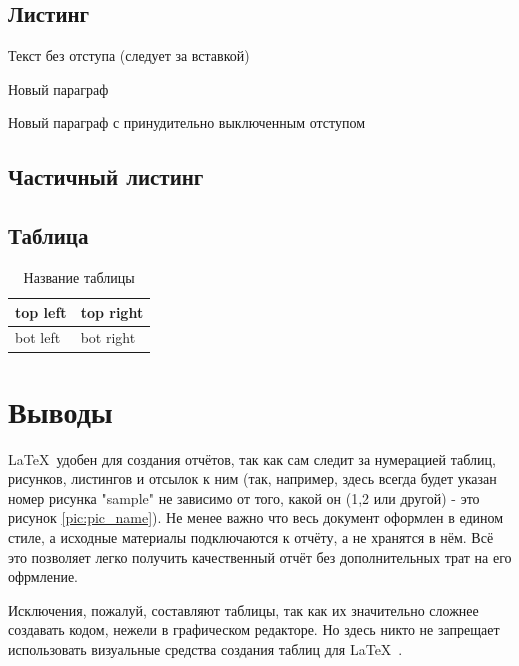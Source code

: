 \subsection{Листинг}


\parindent=1cm %
Текст без отступа (следует за вставкой)

Новый параграф

\noindent Новый параграф с принудительно выключенным отступом


\subsection{Частичный листинг}
\makeatletter
\def\lst@PlaceNumber{\llap{\normalfont
                \lst@numberstyle{\the\lst@lineno}\kern\lst@numbersep}}
\makeatother


\parindent=1cm

\subsection{Таблица}

\begin{table}[H]
	\caption{ Название таблицы}
	\begin{center}
		\begin{tabular}{|l|l|}
			\hline
			top left & top right\\ \hline
			bot left & bot right\\ \hline
		\end{tabular}
		\label{tabular:tab_examp}
	\end{center}
\end{table}

\section{Выводы}
\LaTeX\ удобен для создания отчётов, так как сам следит за нумерацией таблиц, рисунков, листингов и отсылок к ним (так, например, здесь всегда будет указан номер рисунка "sample" не зависимо от того, какой он (1,2 или другой) - это рисунок \ref{pic:pic_name}). Не менее важно что весь документ оформлен в едином стиле, а исходные материалы подключаются к отчёту, а не хранятся в нём. Всё это позволяет легко получить качественный отчёт без дополнительных трат на его офрмление.

Исключения, пожалуй, составляют таблицы, так как их значительно сложнее создавать кодом, нежели в графическом редакторе. Но здесь никто не запрещает использовать визуальные средства создания таблиц для \LaTeX\ .

